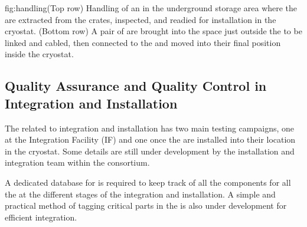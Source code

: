 \begin{dunefigure}{fig:handling}{(Top row) Handling of an  in the underground storage area where the  are extracted from the crates, inspected, and readied for installation in the cryostat. (Bottom row) A pair of  are brought into the space just outside the  to be linked and cabled, then connected to the  and moved into their final position inside the cryostat.}
\setlength{\fboxsep}{0pt}
\setlength{\fboxrule}{0.5pt}
\centering
{} 
\\ \vspace*{1.5mm}
\hspace*{-.25mm}
\hspace*{1.mm}
\end{dunefigure}


\subsection{Quality Assurance and Quality Control in Integration and Installation}
\label{sec:fdsp-apa-install-calib}

The  related to integration and installation has two main testing campaigns, one at the Integration Facility (IF) and one once the  are installed into their location in the cryostat. Some details are still under development by the installation and integration team within the  consortium. 

A dedicated database for  is required to keep track of all the components for all the  at the different stages of the integration and installation. A simple and practical method of tagging critical parts in the  is also under development for efficient integration.

